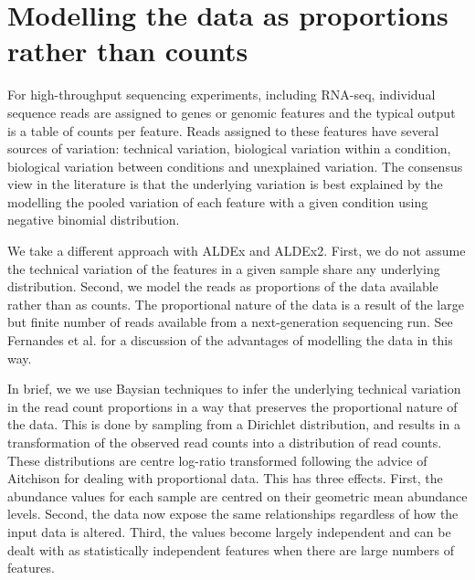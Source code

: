 \documentclass[11pt]{amsart}
\begin{document}
\section{Modelling the data as proportions rather than counts}
For high-throughput sequencing experiments, including RNA-seq, individual sequence reads are assigned to genes or genomic features and the typical output is a table of counts per feature. Reads assigned to these features have several sources of variation: technical variation, biological variation within a condition, biological variation between conditions and unexplained variation. The consensus view in the literature is that the underlying variation is best explained by the modelling the pooled variation of each feature with a given condition using negative binomial distribution. 

We take a different approach with ALDEx and ALDEx2. First, we do not assume the technical variation of the features in a given sample share any underlying distribution. Second, we model the reads as proportions  of the data available rather than as counts. The proportional nature of the data is a result of the large but finite number of reads available from a next-generation sequencing run. See Fernandes et al.\cite{fernandes:2013} for a discussion of the advantages of modelling the data in this way. 

In brief, we we use Baysian techniques to infer the underlying technical variation in the read count proportions in a way that preserves the proportional nature of the data. This is done by sampling from a Dirichlet distribution, and results in a transformation of the observed read counts into a distribution of read counts. These distributions are centre log-ratio transformed following the advice of Aitchison\cite{Aitchison:1986} for dealing with proportional data. This has three effects. First, the abundance values for each sample are centred on their geometric mean abundance levels. Second, the data now expose the same relationships regardless of how the input data is altered. Third, the values become largely independent and can be dealt with as statistically independent features when there are large numbers of features.  
\end{document}
